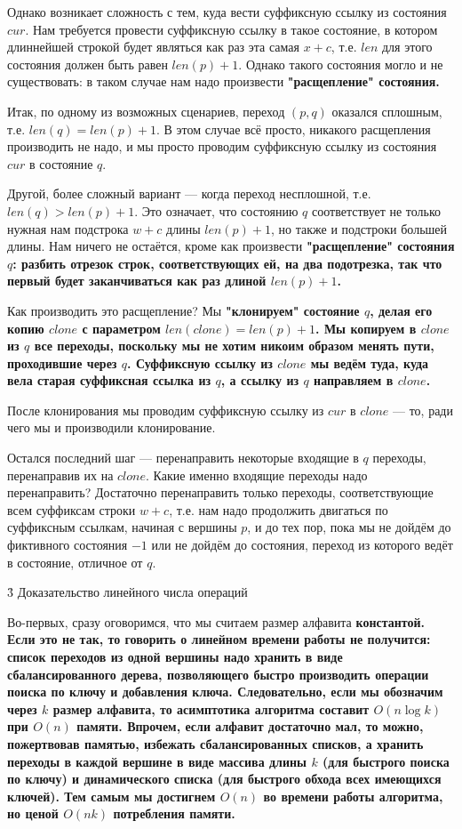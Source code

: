 {Однако возникает сложность с тем, куда вести суффиксную ссылку из состояния $cur$. Нам требуется провести суффиксную ссылку в такое состояние, в котором длиннейшей строкой будет являться как раз эта самая $x+c$, т.е. $len$ для этого состояния должен быть равен $len(p) + 1$. Однако такого состояния могло и не существовать: в таком случае нам надо произвести \bf{"расщепление"} состояния.

\li Итак, по одному из возможных сценариев, переход $(p,q)$ оказался сплошным, т.е. $len(q) = len(p) + 1$. В этом случае всё просто, никакого расщепления производить не надо, и мы просто проводим суффиксную ссылку из состояния $cur$ в состояние $q$.

\li Другой, более сложный вариант --- когда переход несплошной, т.е. $len(q) > len(p) + 1$. Это означает, что состоянию $q$ соответствует не только нужная нам подстрока $w+c$ длины $len(p) + 1$, но также и подстроки большей длины. Нам ничего не остаётся, кроме как произвести \bf{"расщепление"} состояния $q$: разбить отрезок строк, соответствующих ей, на два подотрезка, так что первый будет заканчиваться как раз длиной $len(p) + 1$.

Как производить это расщепление? Мы \bf{"клонируем"} состояние $q$, делая его копию $clone$ с параметром $len(clone) = len(p) + 1$. Мы копируем в $clone$ из $q$ все переходы, поскольку мы не хотим никоим образом менять пути, проходившие через $q$. Суффиксную ссылку из $clone$ мы ведём туда, куда вела старая суффиксная ссылка из $q$, а ссылку из $q$ направляем в $clone$.

После клонирования мы проводим суффиксную ссылку из $cur$ в $clone$ --- то, ради чего мы и производили клонирование.

Остался последний шаг --- перенаправить некоторые входящие в $q$ переходы, перенаправив их на $clone$. Какие именно входящие переходы надо перенаправить? Достаточно перенаправить только переходы, соответствующие всем суффиксам строки $w+c$, т.е. нам надо продолжить двигаться по суффиксным ссылкам, начиная с вершины $p$, и до тех пор, пока мы не дойдём до фиктивного состояния $-1$ или не дойдём до состояния, переход из которого ведёт в состояние, отличное от $q$.

}


\h3{ Доказательство линейного числа операций }

Во-первых, сразу оговоримся, что мы считаем размер алфавита \bf{константой}. Если это не так, то говорить о линейном времени работы не получится: список переходов из одной вершины надо хранить в виде сбалансированного дерева, позволяющего быстро производить операции поиска по ключу и добавления ключа. Следовательно, если мы обозначим через $k$ размер алфавита, то асимптотика алгоритма составит $O (n \log k)$ при $O (n)$ памяти. Впрочем, если алфавит достаточно мал, то можно, пожертвовав памятью, избежать сбалансированных списков, а хранить переходы в каждой вершине в виде массива длины $k$ (для быстрого поиска по ключу) и динамического списка (для быстрого обхода всех имеющихся ключей). Тем самым мы достигнем $O(n)$ во времени работы алгоритма, но ценой $O (n k)$ потребления памяти.

